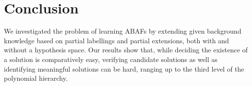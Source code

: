 \documentclass[letterpaper]{article} %
\newcommand{\PiP}[1]{\ComplexityFont{\Pi}_{#1}^{\P}}
\newcommand{\adm}{\textit{ad}}
\newcommand{\com}{\textit{co}}
\newcommand{\stb}{\textit{st}}
\newcommand{\prf}{\textit{pr}}
\newcommand{\asm}{\ensuremath{\mathcal{A}}}
\newcommand{\atoms}{\mathcal{L}}
\newcommand{\ruleset}{\mathcal{R}}
\newcommand{\assumptions}{\mathcal{A}}
\newcommand{\contra}{c}
\newcommand{\ABAdef}{D=(\atoms,\ruleset,\assumptions,\contra)}
\newcommand{\hypo}{H}
\newcommand{\Xpos}{\mathcal{X}^{pos}}
\newcommand{\Xneg}{\mathcal{X}^{neg}}
\newtheorem{corollary}[example]{Corollary}
\begin{document}



\section{Conclusion}
We investigated the problem of learning ABAFs by extending given background knowledge based on partial labellings and partial extensions, both with and without a hypothesis space. 
Our results show that, while deciding the existence of a solution is comparatively easy, verifying candidate solutions as well as identifying meaningful solutions can be hard, ranging up to the third level of the polynomial hierarchy.
\end{document}
